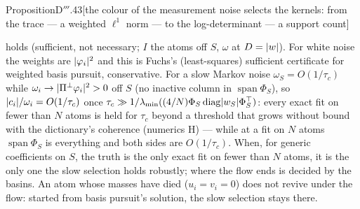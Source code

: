 \begin{thm}{Proposition}{D$'''$.43}[the colour of the measurement noise selects the kernels: from the trace --- a
weighted $\ell^1$ norm --- to the log-determinant --- a support count]
\begin{enumerate}[label=\textup{(\roman*)}]
\[    \]
    holds (sufficient, not necessary; $I$ the atoms off $S$, $\omega$ at $D = \lvert w\rvert$). For white noise the weights are
    $\lvert \varphi_i\rvert^2$ and this is Fuchs's (least-squares) sufficient certificate for weighted basis pursuit,
    conservative. For a slow Markov noise $\omega_S = O(1/\tau_c)$ while $\omega_i\to\lvert \Pi^\perp\varphi_i\rvert^2 > 0$ off
    $S$ (no inactive column in $\operatorname{span}\Phi_S$), so $\lvert c_i\rvert/\omega_i = O(1/\tau_c)$ once
    $\tau_c\gg1/\lambda_{\min}((4/N)\Phi_S\operatorname{diag}\lvert w_S\rvert\Phi_S^\top)$: every exact fit on fewer than $N$
    atoms is held for $\tau_c$ beyond a threshold that grows without bound with the dictionary's coherence (numerics H)
    --- while at a fit on $N$ atoms $\operatorname{span}\Phi_S$ is everything and both sides are $O(1/\tau_c)$. When,
    for generic coefficients on $S$, the truth is the only exact fit on fewer than $N$ atoms, it is the only one the slow
    selection holds robustly; where the flow ends is decided by the basins. An atom whose masses have died
    ($u_i = v_i = 0$) does not revive under the flow: started from basis pursuit's solution, the slow selection stays
    there.
\end{enumerate}
\end{thm}

